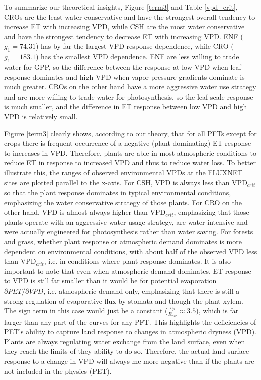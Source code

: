 \documentclass[draft,linenumbers]{agujournal}
\begin{document}
To summarize our theoretical insights, Figure \ref{term3} and Table \ref{vpd_crit}, CROs are the least water conservative and have the strongest overall tendency to increase ET with increasing VPD, while CSH are the most water conservative and have the strongest tendency to decrease ET with increasing VPD.  ENF ($g_1 = 74.31$) has by far the largest VPD response dependence, while CRO ($g_1 = 183.1$) has the smallest VPD dependence. ENF are less willing to trade water for GPP, so the difference between the response at low VPD when leaf response dominates and high VPD when vapor pressure gradients dominate is much greater. CROs on the other hand have a more aggressive water use strategy and are more willing to trade water for photosynthesis, so the leaf scale response is much smaller, and the difference in ET response between low VPD and high VPD is relatively small.

Figure \ref{term3} clearly shows, according to our theory, that for all PFTs except for crops there is frequent occurrence of a negative (plant dominating) ET response to increases in VPD. Therefore, plants are able in most atmospheric conditions to reduce ET in response to increased VPD and thus to reduce water loss. To better illustrate this, the ranges of observed environmental VPDs at the FLUXNET sites are plotted parallel to the x-axis. For CSH, VPD is always less than VPD$_{crit}$ so that the plant response dominates in typical environmental conditions, emphasizing the water conservative strategy of those plants. For CRO on the other hand, VPD is almost always higher than VPD$_{crit}$, emphasizing that those plants operate with an aggressive water usage strategy, are water intensive and were actually engineered for photosynthesis rather than water saving. For forests and grass, whether plant response or atmospheric demand dominates is more dependent on environmental conditions, with about half of the observed VPD less than VPD$_{crit}$, i.e. in conditions where plant response dominates. It is also important to note that even when atmospheric demand dominates, ET response to VPD is still far smaller than it would be for potential evaporation $\partial PET/\partial VPD$, i.e. atmospheric demand only, emphasizing that there is still a strong regulation of evaporative flux by stomata and though the plant xylem. The sign term in this case would just be a constant ($\frac{c_p}{R_{air}} \approx 3.5$), which is far larger than any part of the curves for any PFT. This highlights the deficiencies of PET's ability to capture land response to changes in atmospheric dryness (VPD). Plants are always regulating water exchange from the land surface, even when they reach the limits of they ability to do so. Therefore, the actual land surface response to a change in VPD will always me more negative than if the plants are not included in the physics (PET). 
\end{document}
